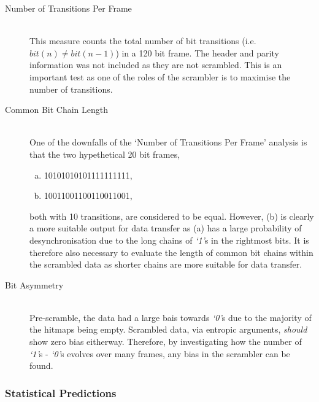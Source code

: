 			\begin{description}
				\item[Number of Transitions Per Frame] \hfill \\
					This measure counts the total number of bit transitions (i.e. $bit(n) \neq bit(n-1)$) in a 120 bit frame. 
					The header and parity information was not included as they are not scrambled.
					This is an important test as one of the roles of the scrambler is to maximise the number of transitions.

				\item[Common Bit Chain Length] \hfill \\
					One of the downfalls of the `Number of Transitions Per Frame' analysis is that the two hypethetical 20 bit frames,

					\begin{enumerate}[a)]
						\item \textsc{10101010101111111111},
						\item \textsc{10011001100110011001},
					\end{enumerate}

					both with 10 transitions, are considered to be equal. However, (b) is clearly a more suitable output for data transfer as (a) has a large probability of desynchronisation due to the long chains of \textit{`1'}s in the rightmost bits.
					It is therefore also necessary to evaluate the length of common bit chains within the scrambled data as shorter chains are more suitable for data transfer.

				\item[Bit Asymmetry] \hfill \\
					Pre-scramble, the data had a large bais towards \textit{`0'}s due to the majority of the hitmaps being empty.
					Scrambled data, via entropic arguments, \textit{should} show zero bias eitherway.
					Therefore, by investigating how the number of \textit{`1'}s - \textit{`0'}s evolves over many frames, any bias in the scrambler can be found.

			\end{description}	

		\subsubsection{Statistical Predictions} %
		\label{subsub:statistical_predictions}

